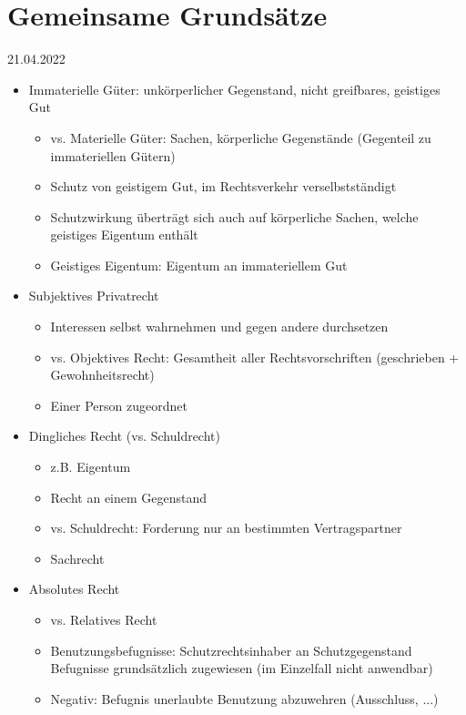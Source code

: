 \documentclass{report}
\begin{document}
\section{Gemeinsame Grundsätze}
21.04.2022
\begin{itemize}
	\item Immaterielle Güter:
	\newline unkörperlicher Gegenstand, nicht greifbares, geistiges Gut
	\begin{itemize}
		\item vs. Materielle Güter: Sachen, körperliche Gegenstände (Gegenteil zu immateriellen Gütern)
		\item Schutz von geistigem Gut, im Rechtsverkehr verselbstständigt
		\item Schutzwirkung überträgt sich auch auf körperliche Sachen, welche geistiges Eigentum enthält
		\item Geistiges Eigentum: Eigentum an immateriellem Gut
	\end{itemize}
	\item Subjektives Privatrecht
	\begin{itemize}
		\item Interessen selbst wahrnehmen und gegen andere durchsetzen
		\item vs. Objektives Recht: Gesamtheit aller Rechtsvorschriften (geschrieben + Gewohnheitsrecht)
		\item Einer Person zugeordnet
	\end{itemize}
	\item Dingliches Recht (vs. Schuldrecht)
	\begin{itemize}
		\item z.B. Eigentum
		\item Recht an einem Gegenstand
		\item vs. Schuldrecht: Forderung nur an bestimmten Vertragspartner
		\item Sachrecht
	\end{itemize}
	\item Absolutes Recht
	\begin{itemize}
		\item vs. Relatives Recht
		\item Benutzungsbefugnisse: Schutzrechtsinhaber an Schutzgegenstand
		\newline Befugnisse grundsätzlich zugewiesen (im Einzelfall nicht anwendbar)
		\item Negativ: Befugnis unerlaubte Benutzung abzuwehren (Ausschluss, ...)
	\end{itemize}
\end{itemize}
\end{document}
